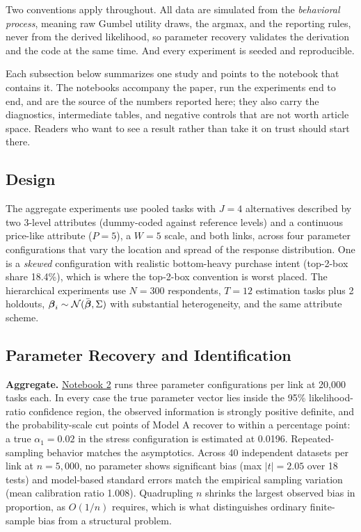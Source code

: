 \documentclass[
  letterpaper,
  DIV=11,
  numbers=noendperiod]{scrartcl}
\theoremstyle{plain}
\theoremstyle{plain}
\theoremstyle{remark}
\begin{document}
Two conventions apply throughout. All data are simulated from the
\emph{behavioral process}, meaning raw Gumbel utility draws, the argmax,
and the reporting rules, never from the derived likelihood, so parameter
recovery validates the derivation and the code at the same time. And
every experiment is seeded and reproducible.

Each subsection below summarizes one study and points to the notebook
that contains it. The notebooks accompany the paper, run the experiments
end to end, and are the source of the numbers reported here; they also
carry the diagnostics, intermediate tables, and negative controls that
are not worth article space. Readers who want to see a result rather
than take it on trust should start there.

\subsection{Design}\label{sec-simdesign}

The aggregate experiments use pooled tasks with \(J = 4\) alternatives
described by two 3-level attributes (dummy-coded against reference
levels) and a continuous price-like attribute (\(P = 5\)), a \(W = 5\)
scale, and both links, across four parameter configurations that vary
the location and spread of the response distribution. One is a
\emph{skewed} configuration with realistic bottom-heavy purchase intent
(top-2-box share 18.4\%), which is where the top-2-box convention is
worst placed. The hierarchical experiments use \(N = 300\) respondents,
\(T = 12\) estimation tasks plus 2 holdouts,
\(\boldsymbol{\beta}_i \sim \mathcal{N}(\bar{\boldsymbol{\beta}}, \Sigma)\) with substantial
heterogeneity, and the same attribute scheme.

\subsection{Parameter Recovery and Identification}\label{sec-sim-agg}

\textbf{Aggregate.} \href{notebooks/02-aggregate-recovery.qmd}{Notebook
2} runs three parameter configurations per link at 20,000 tasks each. In
every case the true parameter vector lies inside the 95\%
likelihood-ratio confidence region, the observed information is strongly
positive definite, and the probability-scale cut points of Model A
recover to within a percentage point: a true \(\alpha_1 = 0.02\) in the
stress configuration is estimated at 0.0196. Repeated-sampling behavior
matches the asymptotics. Across 40 independent datasets per link at
\(n = 5{,}000\), no parameter shows significant bias (max \(|t| = 2.05\)
over 18 tests) and model-based standard errors match the empirical
sampling variation (mean calibration ratio 1.008). Quadrupling \(n\)
shrinks the largest observed bias in proportion, as \(O(1/n)\) requires,
which is what distinguishes ordinary finite-sample bias from a
structural problem.
\end{document}
